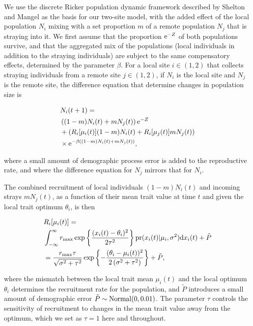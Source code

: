 \documentclass[twocolumn,preprintnumbers,amsmath,amssymb,superscriptaddress]{revtex4}
\begin{document}
We use the discrete Ricker population dynamic framework described by Shelton and Mangel \cite{Shelton:2011eq} as the basis for our two-site model, with the added effect of the local population $N_i$ mixing with a set proportion $m$ of a remote population $N_j$ that is straying into it.
We first assume that the proportion ${\rm e}^{-Z}$ of both populations survive, and that the aggregated mix of the populations (local individuals in addition to the straying individuals) are subject to the same compensatory effects, determined by the parameter $\beta$.
For a local site $i\in(1,2)$ that collects straying individuals from a remote site $j\in(1,2)$, if $N_i$ is the local site and $N_j$ is the remote site, the difference equation that determine changes in population size is

\begin{align}
  &N_i(t+1) = \\ \nonumber
  &\left((1-m)N_i(t) + m N_j(t) \right){\rm e}^{-Z} \\ \nonumber
  &+ \left(R_i[\mu_i(t)] (1-m)N_i(t) + R_i[\mu_j(t)] m N_j(t)\right) \\ \nonumber
  &\times {\rm e}^{-\beta ((1-m)N_i(t) + m N_j(t))},
  \label{eq:N}
\end{align}

\noindent where a small amount of demographic process error is added to the reproductive rate, and where the difference equation for $N_j$ mirrors that for $N_i$.

The combined recruitment of local individuals $(1-m)N_i(t)$ and incoming strays $mN_j(t)$, as a function of their mean trait value at time $t$ and given the local trait optimum $\theta_i$, is then

\begin{align}
  &R_i[\mu_i(t)] = \\ \nonumber
  &\int_{-\infty}^\infty r_{\rm max}\exp\left\{\frac{(x_i(t)-\theta_i)^2}{2\tau^2}\right\} {\rm pr}(x_i(t)|\mu_i,\sigma^2) {\rm d}x_i(t) +\tilde{P}\\ \nonumber
  &= \frac{r_{\rm max} \tau  }{\sqrt{\sigma ^2+\tau ^2}}\exp\left\{-\frac{(\theta_i-\mu_i(t))^2}{2 \left(\sigma ^2+\tau ^2\right)}\right\} +\tilde{P},
  \label{eq:R}
\end{align}

\noindent where the mismatch between the local trait mean $\mu_i(t)$ and the local optimum $\theta_i$ determines the recruitment rate for the population, and $\tilde{P}$ introduces a small amount of demographic error $\tilde{P}\sim {\rm Normal}(0,0.01)$.
The parameter $\tau$ controls the sensitivity of recruitment to changes in the mean trait value away from the optimum, which we set as $\tau=1$ here and throughout.
\\
\end{document}
